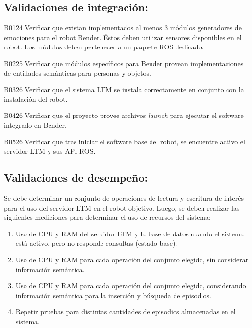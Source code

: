 \subsection{Validaciones de integración: }

\begin{def-validacion}{B}{01}{24}
	Verificar que existan implementados al menos 3 módulos generadores de emociones para el robot Bender. Éstos deben utilizar sensores disponibles en el robot. Los módulos deben pertenecer a un paquete ROS dedicado.	
\end{def-validacion}

\begin{def-validacion}{B}{02}{25}
Verificar que módulos específicos para Bender provean implementaciones de entidades semánticas para personas y objetos.
\end{def-validacion}

\begin{def-validacion}{B}{03}{26}
Verificar que el sistema LTM se instala correctamente en conjunto con la instalación del robot.	
\end{def-validacion}

\begin{def-validacion}{B}{04}{26}
Verificar que el proyecto provee archivos \textit{launch} para ejecutar el software integrado en Bender.
\end{def-validacion}

\begin{def-validacion}{B}{05}{26}
Verificar que tras iniciar el software base del robot, se encuentre activo el servidor LTM y sus API ROS.
\end{def-validacion}


\subsection{Validaciones de desempeño: }

Se debe determinar un conjunto de operaciones de lectura y escritura de interés para el uso del servidor LTM en el robot objetivo. Luego, se deben realizar las siguientes mediciones para determinar el uso de recursos del sistema:
\begin{enumerate}
	\item Uso de CPU y RAM del servidor LTM y la base de datos cuando el sistema está activo, pero no responde consultas (estado base).
	\item Uso de CPU y RAM para cada operación del conjunto elegido, sin considerar información semántica.
	\item Uso de CPU y RAM para cada operación del conjunto elegido, considerando información semántica para la inserción y búsqueda de episodios.
	\item Repetir pruebas para distintas cantidades de episodios almacenadas en el sistema.
\end{enumerate}

